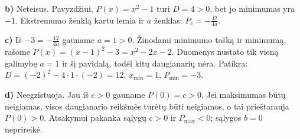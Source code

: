 \documentclass[12pt,a4paper]{article}
\begin{document}
\begin{enumerate}
\textbf{b)} Neteisus. Pavyzdžiui, $P(x)=x^2-1$ turi $D=4>0$, bet jo minimumas yra $-1$. Ekstremumo ženklą kartu lemia ir $a$ ženklas: $P_{\mathrm e}=-\frac{D}{4a}$.

\textbf{c)} Iš $-3=-\frac{12}{4a}$ gauname $a=1>0$. Žinodami minimumo tašką ir minimumą, rašome $P(x)=(x-1)^2-3=x^2-2x-2$. Duomenys nustato tik vieną galimybę $a=1$ ir šį pavidalą, todėl kitų daugianarių nėra. Patikra: $D=(-2)^2-4\cdot1\cdot(-2)=12$, $x_{\min}=1$, $P_{\min}=-3$.

\textbf{d)} Neegzistuoja. Jau iš $c>0$ gauname $P(0)=c>0$. Jei maksimumas būtų neigiamas, visos daugianario reikšmės turėtų būti neigiamos, o tai prieštarauja $P(0)>0$. Atsakymui pakanka sąlygų $c>0$ ir $P_{\max}<0$; sąlygos $b=0$ neprireikė.
\end{enumerate}
\end{document}
